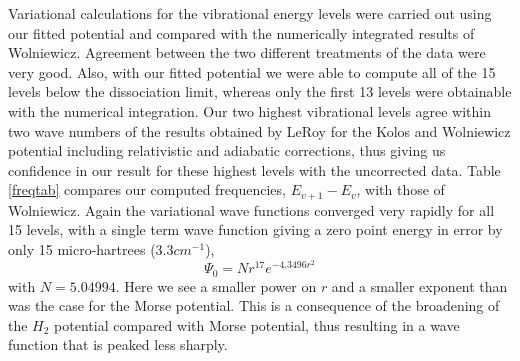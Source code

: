 Variational calculations for the vibrational energy levels were carried out
using our fitted potential and compared with the numerically integrated
results of Wolniewicz\cite{Wolniewicz66}. Agreement between the two
different treatments of the data were very good. Also, with our fitted
potential we were able to compute all of the 15 levels below the
dissociation limit, whereas only the first 13 levels were obtainable with
the numerical integration. Our two highest vibrational levels agree within
two wave numbers of the results obtained by LeRoy\cite{LeRoy68} for the
Kolos and Wolniewicz potential including relativistic and adiabatic
corrections, thus giving us confidence in our result for these highest
levels with the uncorrected data. Table \ref{freqtab} compares our computed
frequencies, $E_{v+1}-E_v$, with those of Wolniewicz\cite{Wolniewicz66}.
Again the variational wave functions converged very rapidly for all 15
levels, with a single term wave function giving a zero point energy in error
by only 15 micro-hartrees (3.3$cm^{-1}$), 
\begin{equation}
\Psi _0=Nr^{17}e^{-4.3496r^2}
\end{equation}
with $N=5.04994$. Here we see a smaller power on $r$ and a smaller exponent
than was the case for the Morse potential. This is a consequence of the
broadening of the $H_2$ potential compared with Morse potential, thus
resulting in a wave function that is peaked less sharply.

